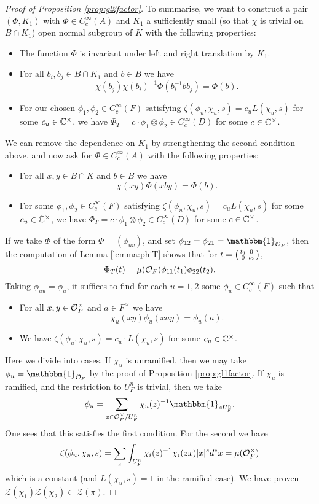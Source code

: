 \begin{proof}[Proof of Proposition \ref{prop:gl2factor}]
    To summarise, we want to construct a pair $(\Phi,K_1)$ with $\Phi \in C_c^\infty(A)$ and $K_1$ a sufficiently small (so that $\chi$ is trivial on $B \cap K_1$) open normal subgroup of $K$ with the following properties:
    \begin{itemize}
        \item The function $\Phi$ is invariant under left and right translation by $K_1$.
        \item For all $b_i,b_j \in B \cap K_1$ and $b \in B$ we have $$\chi(b_j)\chi(b_i)^{-1}\Phi(b_i^{-1}bb_j) = \Phi(b).$$
        \item For our chosen $\phi_1,\phi_2 \in C_c^\infty(F)$ satisfying $\zeta(\phi_u,\chi_u,s)=c_uL(\chi_u,s)$ for some $c_u \in \mathbb{C}^\times$, we have $\Phi_T = c \cdot \phi_1 \otimes \phi_2 \in C_c^\infty(D)$ for some $c \in \mathbb{C}^\times$.
    \end{itemize}
    We can remove the dependence on $K_1$ by strengthening the second condition above, and now ask for $\Phi \in C_c^\infty(A)$ with the following properties:
    \begin{itemize}
        \item For all $x,y \in B \cap K$ and $b \in B$ we have $$\chi(xy)\Phi(xby) = \Phi(b).$$
        \item For some $\phi_1,\phi_2 \in C_c^\infty(F)$ satisfying $\zeta(\phi_u,\chi_u,s)=c_uL(\chi_u,s)$ for some $c_u \in \mathbb{C}^\times$, we have $\Phi_T = c \cdot \phi_1 \otimes \phi_2 \in C_c^\infty(D)$ for some $c \in \mathbb{C}^\times$.
    \end{itemize}
    If we take $\Phi$ of the form $\Phi=(\phi_{uv})$, and set $\phi_{12}=\phi_{21}=\mathbbm{1}_{\mathcal O_F}$, then the computation of Lemma \ref{lemma:phiT} shows that for $t= \begin{psmallmatrix}
        t_1&0\\0&t_2
    \end{psmallmatrix}$,
    $$\Phi_T(t) = \mu(\mathcal{O}_F)\phi_{11}(t_1)\phi_{22}(t_2).$$
    Taking $\phi_{uu}=\phi_u$, it suffices to find for each $u=1,2$ some $\phi_u \in C_c^\infty(F)$ such that
    \begin{itemize}
        \item For all $x,y \in \mathcal{O}_F^\times$ and $a \in F^\times$ we have $$\chi_u(xy)\phi_u(xay) = \phi_u(a).$$
        \item We have $\zeta(\phi_u,\chi_u,s)=c_u \cdot L(\chi_u,s)$ for some $c_u \in \mathbb{C}^\times$.
    \end{itemize}
    Here we divide into cases. If $\chi_u$ is unramified, then we may take $\phi_u = \mathbbm{1}_{\cO_F}$ by the proof of Proposition \ref{prop:gl1factor}. If $\chi_u$ is ramified, and the restriction to $U_F^n$ is trivial, then we take 
    $$ \phi_u = \sum\limits_{z \in \cO_F^\times/U_F^n} \chi_u(z)^{-1} \mathbbm{1}_{zU_F^n}.$$ One sees that this satisfies the first condition. For the second we have 
    $$\zeta(\phi_u,\chi_u,s) = \sum\limits_z \int_{U_F^n} \chi_i(z)^{-1}\chi_i(zx)|x|^s d^*x = \mu(\mathcal{O}_F^\times)$$ which is a constant (and $L(\chi_u,s)=1$ in the ramified case). We have proven $\mathcal Z(\chi_1)\mathcal Z(\chi_2) \subset \mathcal Z(\pi)$.
\end{proof}

